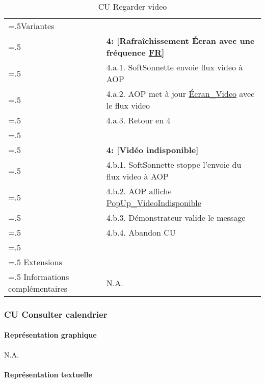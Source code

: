 \begin{table}[H]
\begin{tabularx}{\textwidth}{|>{\hsize=.5\hsize}X|>{\hsize=1.5\hsize}X|}
    \hline
    Variantes & \\
    & \textbf{4: [Rafraîchissement Écran avec une fréquence \hyperlink{fr}{FR}]} \\
    & 4.a.1. SoftSonnette envoie flux video à AOP \\
    & 4.a.2. AOP met à jour \hyperlink{EcranVideo}{Écran\_Video} avec le flux video \\
    & 4.a.3. Retour en 4 \\
    & \\
    & \textbf{4: [Vidéo indisponible]} \\
    & 4.b.1. SoftSonnette stoppe l'envoie du flux video à AOP \\
    & 4.b.2. AOP affiche \hyperlink{popUpVideoIndisponible}{PopUp\_VideoIndisponible} \\
    & 4.b.3. Démonstrateur valide le message \\
    & 4.b.4. Abandon CU \\
    & \\
    \hline
    Extensions & \\
    \hline
    Informations complémentaires & N.A. \\
    \hline
  \end{tabularx}
  \caption{CU Regarder video}
  \label{tableau-cu-Regarder-video}
\end{table}

\newpage

\subsubsection{CU Consulter calendrier}

\paragraph{Représentation graphique}

N.A.

\paragraph{Représentation textuelle}
\hypertarget{CU_Consulter_calendrier}{}


